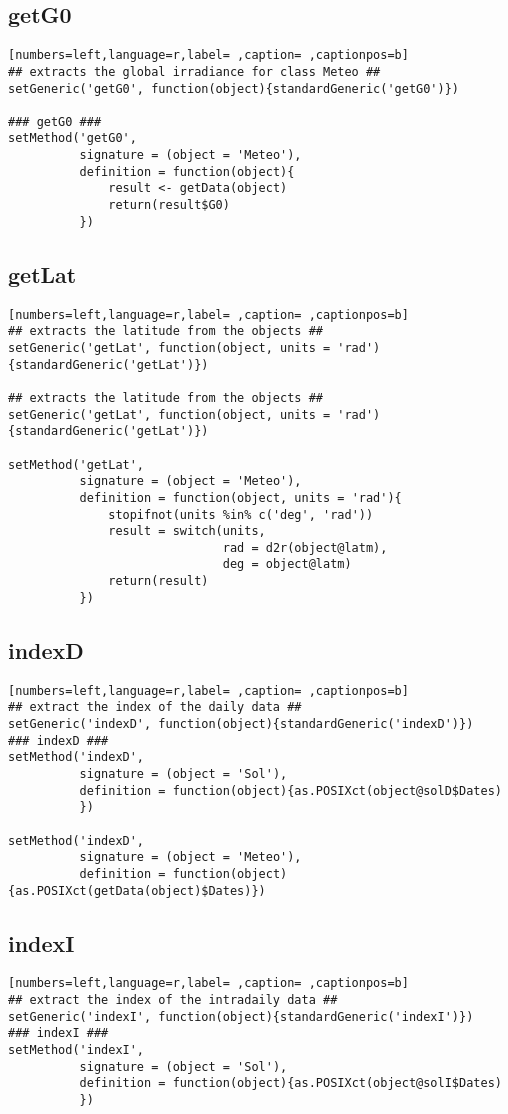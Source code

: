 \subsection{getG0}
\label{sec:orgad698f7}
\begin{lstlisting}[numbers=left,language=r,label= ,caption= ,captionpos=b]
## extracts the global irradiance for class Meteo ##
setGeneric('getG0', function(object){standardGeneric('getG0')})

### getG0 ###
setMethod('getG0',
          signature = (object = 'Meteo'),
          definition = function(object){
              result <- getData(object)
              return(result$G0)
          })
\end{lstlisting}
\subsection{getLat}
\label{sec:orgea5be34}
\begin{lstlisting}[numbers=left,language=r,label= ,caption= ,captionpos=b]
## extracts the latitude from the objects ##
setGeneric('getLat', function(object, units = 'rad')
{standardGeneric('getLat')})

## extracts the latitude from the objects ##
setGeneric('getLat', function(object, units = 'rad')
{standardGeneric('getLat')})

setMethod('getLat',
          signature = (object = 'Meteo'),
          definition = function(object, units = 'rad'){
              stopifnot(units %in% c('deg', 'rad'))
              result = switch(units,
                              rad = d2r(object@latm),
                              deg = object@latm)
              return(result)
          })
\end{lstlisting}
\subsection{indexD}
\label{sec:orgd8802d2}
\begin{lstlisting}[numbers=left,language=r,label= ,caption= ,captionpos=b]
## extract the index of the daily data ##
setGeneric('indexD', function(object){standardGeneric('indexD')})
### indexD ###
setMethod('indexD',
          signature = (object = 'Sol'),
          definition = function(object){as.POSIXct(object@solD$Dates)
          })

setMethod('indexD',
          signature = (object = 'Meteo'),
          definition = function(object){as.POSIXct(getData(object)$Dates)})
\end{lstlisting}
\subsection{indexI}
\label{sec:org5e26629}
\begin{lstlisting}[numbers=left,language=r,label= ,caption= ,captionpos=b]
## extract the index of the intradaily data ##
setGeneric('indexI', function(object){standardGeneric('indexI')})
### indexI ###
setMethod('indexI',
          signature = (object = 'Sol'),
          definition = function(object){as.POSIXct(object@solI$Dates)
          })
\end{lstlisting}
